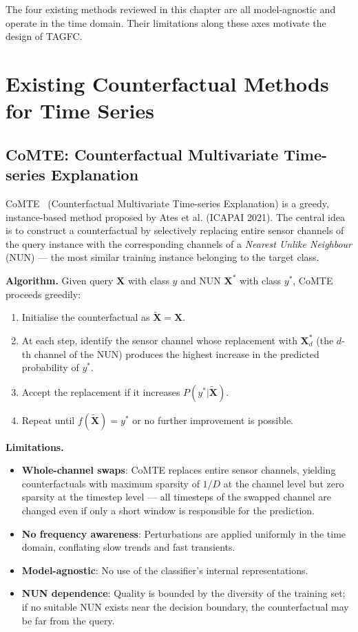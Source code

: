 The four existing methods reviewed in this chapter are all model-agnostic and operate in the time domain. Their limitations along these axes motivate the design of TAGFC.

\section{Existing Counterfactual Methods for Time Series}

\subsection{CoMTE: Counterfactual Multivariate Time-series Explanation}

CoMTE~\cite{ates2021counterfactual} (Counterfactual Multivariate Time-series Explanation) is a greedy, instance-based method proposed by Ates et al. (ICAPAI 2021). The central idea is to construct a counterfactual by selectively replacing entire sensor channels of the query instance with the corresponding channels of a \textit{Nearest Unlike Neighbour} (NUN) — the most similar training instance belonging to the target class.

\textbf{Algorithm.} Given query $\mathbf{X}$ with class $y$ and NUN $\mathbf{X}^*$ with class $y^*$, CoMTE proceeds greedily:
\begin{enumerate}
    \item Initialise the counterfactual as $\widetilde{\mathbf{X}} = \mathbf{X}$.
    \item At each step, identify the sensor channel whose replacement with $\mathbf{X}^*_d$ (the $d$-th channel of the NUN) produces the highest increase in the predicted probability of $y^*$.
    \item Accept the replacement if it increases $P(y^* | \widetilde{\mathbf{X}})$.
    \item Repeat until $f(\widetilde{\mathbf{X}}) = y^*$ or no further improvement is possible.
\end{enumerate}

\textbf{Limitations.}
\begin{itemize}
    \item \textbf{Whole-channel swaps}: CoMTE replaces entire sensor channels, yielding counterfactuals with maximum sparsity of $1/D$ at the channel level but zero sparsity at the timestep level — all timesteps of the swapped channel are changed even if only a short window is responsible for the prediction.
    \item \textbf{No frequency awareness}: Perturbations are applied uniformly in the time domain, conflating slow trends and fast transients.
    \item \textbf{Model-agnostic}: No use of the classifier's internal representations.
    \item \textbf{NUN dependence}: Quality is bounded by the diversity of the training set; if no suitable NUN exists near the decision boundary, the counterfactual may be far from the query.
\end{itemize}

